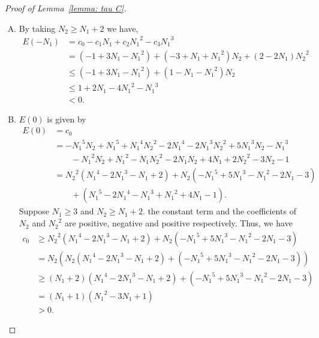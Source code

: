 \documentclass[10pt,a4paper]{amsart}
\begin{document}
\begin{proof}[Proof of Lemma~\ref{lemma: tau C}]
\begin{enumerate}[A.]
			\item 
			By taking $N_2\geq N_1+2$ we have,
			\begin{align*}
				E(-N_1)
				&=c_0-c_1{N_1}+c_2{N_1}^2-c_3{N_1}^3 \\
				&=\left(-1+3{N_1}-{N_1}^2\right)+\left(-3+{N_1}+{N_1}^2\right){N_2}+\left(2-2{N_1}\right){N_2}^2 \\
				&\leq \left(-1+3{N_1}-{N_1}^2\right)+\left(1-{N_1}-{N_1}^2\right)N_2 \\
				&\leq 1+2{N_1}-4{N_1}^2-{N_1}^3 \\
				&<0.
			\end{align*}
			
			\item 
			$E(0)$ is given by
			\begin{align*}
				E(0)
				&= c_0\\
				&=-{N_1}^5N_2+{N_1}^5+{N_1}^4{N_2}^2-2{N_1}^4-2{N_1}^3{N_2}^2+5{N_1}^3N_2-{N_1}^3 \\
				&\qquad-{N_1}^2N_2+{N_1}^2-N_1{N_2}^2-2N_1N_2+4N_1+2{N_2}^2-3N_2-1 \\
				&=
				{N_2}^2({N_1}^4-2{N_1}^3-N_1+2)+N_2(-{N_1}^5+5{N_1}^3-{N_1}^2-2N_1-3)\\
				&\qquad+({N_1}^5-2{N_1}^4-{N_1}^3+{N_1}^2+4N_1-1).
			\end{align*}
			Suppose $N_1\geq 3$ and $N_2 \geq N_1+2$. the constant term and the coefficients of ${N_2}$ and ${N_2}^2$ are positive, negative and positive respectively. Thus, we have
			\begin{align*}
				c_0 &\geq {N_2}^2\left({N_1}^4-2{N_1}^3-N_1+2\right)+N_2\left(-{N_1}^5+5{N_1}^3-{N_1}^2-2N_1-3\right) \\
				&= N_2\left(N_2\left({N_1}^4-2{N_1}^3-N_1+2\right)+\left(-{N_1}^5+5{N_1}^3-{N_1}^2-2N_1-3\right)\right) \\
				&\geq  (N_1+2)\left({N_1}^4-2{N_1}^3-N_1+2\right)+\left(-{N_1}^5+5{N_1}^3-{N_1}^2-2N_1-3\right) \\
				&= (N_1+1)\left({N_1}^2-3N_1+1\right) \\
				&>0.
			\end{align*}
			

\end{enumerate}
\end{proof}
\end{document}
